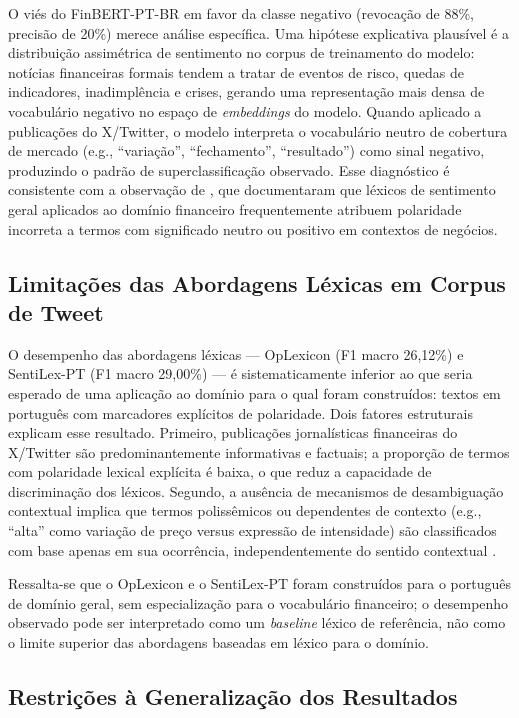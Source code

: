 O viés do FinBERT-PT-BR em favor da classe negativo (revocação de 88\%, precisão de 20\%) merece análise específica. Uma hipótese explicativa plausível é a distribuição assimétrica de sentimento no corpus de treinamento do modelo: notícias financeiras formais tendem a tratar de eventos de risco, quedas de indicadores, inadimplência e crises, gerando uma representação mais densa de vocabulário negativo no espaço de \textit{embeddings} do modelo. Quando aplicado a publicações do X/Twitter, o modelo interpreta o vocabulário neutro de cobertura de mercado (e.g., ``variação'', ``fechamento'', ``resultado'') como sinal negativo, produzindo o padrão de superclassificação observado. Esse diagnóstico é consistente com a observação de , que documentaram que léxicos de sentimento geral aplicados ao domínio financeiro frequentemente atribuem polaridade incorreta a termos com significado neutro ou positivo em contextos de negócios.

\subsection{Limitações das Abordagens Léxicas em Corpus de Tweet}
\label{subsec:discussao_lexical}

O desempenho das abordagens léxicas --- OpLexicon (F1 macro 26,12\%) e SentiLex-PT (F1 macro 29,00\%) --- é sistematicamente inferior ao que seria esperado de uma aplicação ao domínio para o qual foram construídos: textos em português com marcadores explícitos de polaridade. Dois fatores estruturais explicam esse resultado. Primeiro, publicações jornalísticas financeiras do X/Twitter são predominantemente informativas e factuais; a proporção de termos com polaridade lexical explícita é baixa, o que reduz a capacidade de discriminação dos léxicos. Segundo, a ausência de mecanismos de desambiguação contextual implica que termos polissêmicos ou dependentes de contexto (e.g., ``alta'' como variação de preço versus expressão de intensidade) são classificados com base apenas em sua ocorrência, independentemente do sentido contextual \cite{liu2020survey}.

Ressalta-se que o OpLexicon e o SentiLex-PT foram construídos para o português de domínio geral, sem especialização para o vocabulário financeiro; o desempenho observado pode ser interpretado como um \textit{baseline} léxico de referência, não como o limite superior das abordagens baseadas em léxico para o domínio.


\subsection{Restrições à Generalização dos Resultados}
\label{subsec:discussao_restricoes}

